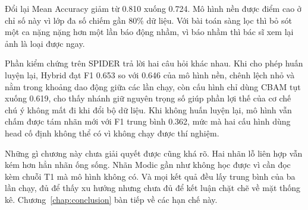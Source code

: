 Đổi lại Mean Accuracy giảm từ 0.810 xuống 0.724. Mô hình nền được điểm cao ở chỉ số này vì lớp đa số chiếm gần 80\% dữ liệu. Với bài toán sàng lọc thì bỏ sót một ca nặng nặng hơn một lần báo động nhầm, vì báo nhầm thì bác sĩ xem lại ảnh là loại được ngay.

Phần kiểm chứng trên SPIDER trả lời hai câu hỏi khác nhau. Khi cho phép huấn luyện lại, Hybrid đạt F1 0.653 so với 0.646 của mô hình nền, chênh lệch nhỏ và nằm trong khoảng dao động giữa các lần chạy, còn cấu hình chỉ dùng CBAM tụt xuống 0.619, cho thấy nhánh giữ nguyên trọng số giúp phần lợi thế của cơ chế chú ý không mất đi khi đổi bộ dữ liệu. Khi không huấn luyện lại, mô hình vẫn chấm được tám nhãn mới với F1 trung bình 0.362, mức mà hai cấu hình dùng head cố định không thể có vì không chạy được thí nghiệm.

Những gì chương này chưa giải quyết được cũng khá rõ. Hai nhãn lỗ liên hợp vẫn kém hơn hẳn nhãn ống sống. Nhãn Modic gần như không học được vì cần đọc kèm chuỗi T1 mà mô hình không có. Và mọi kết quả đều lấy trung bình của ba lần chạy, đủ để thấy xu hướng nhưng chưa đủ để kết luận chặt chẽ về mặt thống kê. Chương~\ref{chap:conclusion} bàn tiếp về các hạn chế này.
